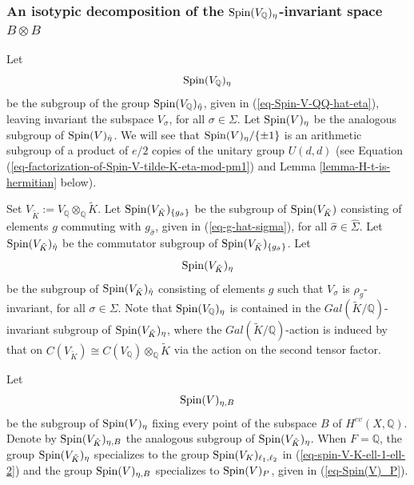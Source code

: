 \documentclass[12pt]{amsart}
\numberwithin{equation}{subsection}
\theoremstyle{plain}
\theoremstyle{definition}
\newcommand{\QQ}{{\mathbb Q}}
\newcommand{\Spin}{{\rm Spin}}
\newcommand{\End}{{\rm End}}
\begin{document}
{%
%
\subsubsection{An isotypic decomposition of the $\Spin(V_\QQ)_\eta$-invariant space $B\otimes B$}
\label{sec-isotypic-decomposition}
Let 
\[
\Spin(V_\QQ)_\eta
\]
be the subgroup of the group $\Spin(V_\QQ)_{\hat{\eta}}$, given in (\ref{eq-Spin-V-QQ-hat-eta}),
leaving invariant the subspace $V_\sigma$, for all $\sigma\in\Sigma$.
Let $\Spin(V)_\eta$ be the analogous subgroup of $\Spin(V)_{\hat{\eta}}$. We will see that $\Spin(V)_\eta/\{\pm 1\}$ is an arithmetic subgroup of a product of $e/2$ copies of the unitary group $U(d,d)$ (see Equation 
(\ref{eq-factorization-of-Spin-V-tilde-K-eta-mod-pm1}) and Lemma \ref{lemma-H-t-is-hermitian} below).

Set $V_{\tilde{K}}:=V_\QQ\otimes_\QQ\tilde{K}$. Let  $\Spin(V_{\tilde{K}})_{\{g_{\hat{\sigma}}\}}$ be the subgroup of $\Spin(V_{\tilde{K}})$ consisting of elements $g$ commuting with $g_{\hat{\sigma}}$, given in (\ref{eq-g-hat-sigma}), for all $\hat{\sigma}\in\hat{\Sigma}$. Let 
$\Spin(V_{\tilde{K}})_{\hat{\eta}}$ be the commutator subgroup of $\Spin(V_{\tilde{K}})_{\{g_{\hat{\sigma}}\}}$.
Let  
\[
\Spin(V_{\tilde{K}})_\eta
\] 
be the subgroup of $\Spin(V_{\tilde{K}})_{\hat{\eta}}$ consisting of elements $g$ 
such that $V_\sigma$ is $\rho_g$-invariant, for all $\sigma\in\Sigma$. Note that $\Spin(V_\QQ)_\eta$ is contained in the $Gal(\tilde{K}/\QQ)$-invariant subgroup of $\Spin(V_{\tilde{K}})_\eta$, where the $Gal(\tilde{K}/\QQ)$-action is induced by that on $C(V_{\tilde{K}})\cong C(V_\QQ)\otimes_\QQ\tilde{K}$ via the action on the second tensor factor.

Let 
\[
\Spin(V)_{\eta,B}
\]
be the subgroup of $\Spin(V)_{\eta}$ fixing every point of the subspace $B$ of $H^{ev}(X,\QQ)$. Denote by
$\Spin(V_{\tilde{K}})_{\eta,B}$ the analogous subgroup of $\Spin(V_{\tilde{K}})_\eta$.
When $F=\QQ$, the group $\Spin(V_{\tilde{K}})_\eta$ specializes to the group $\Spin(V_K)_{\ell_1,\ell_2}$ in (\ref{eq-spin-V-K-ell-1-ell-2})
and the group $\Spin(V)_{\eta,B}$ specializes to $\Spin(V)_P$, given in (\ref{eq-Spin(V)_P}).

}
\end{document}
